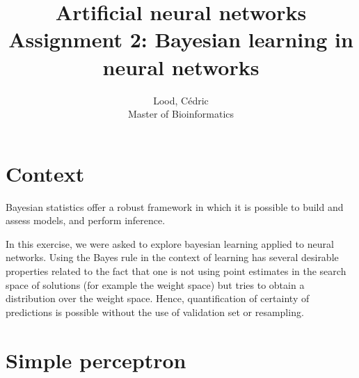 \documentclass[11pt, a4paper]{article}
\title{ \huge Artificial neural networks \\ 
  { \large Assignment 2: Bayesian learning in neural networks }}
\author{
        Lood, Cédric \\
        \small Master of Bioinformatics
}
\begin{document}
\maketitle

\section{Context}
Bayesian statistics offer a robust framework in which it is possible
to build and assess models, and perform inference.

In this exercise, we were asked to explore bayesian learning applied
to neural networks. Using the Bayes rule in the context of learning
has several desirable properties related to the fact that one is not
using point estimates in the search space of solutions (for example
the weight space) but tries to obtain a distribution over the weight
space. Hence, quantification of certainty of predictions is possible
without the use of validation set or resampling.

\section{Simple perceptron}

 

\end{document}
